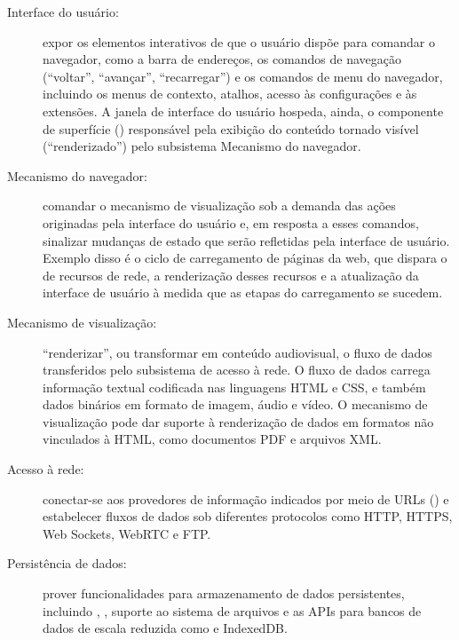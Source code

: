 \begin{quadro}[h]
	\begin{framed}{\small
	\begin{description}
		\item [Interface do usuário:] expor os elementos interativos de que o usuário dispõe para comandar o navegador, como a barra de endereços, os comandos de navegação (``voltar'', ``avançar'', ``recarregar'') e os comandos de menu do navegador, incluindo os menus de contexto, atalhos, acesso às configurações e às extensões. A janela de interface do usuário hospeda, ainda, o componente de superfície () responsável pela exibição do conteúdo tornado visível (``renderizado'') pelo subsistema Mecanismo do navegador.
		
		\item [Mecanismo do navegador:] comandar o mecanismo de visualização sob a demanda das ações originadas pela interface do usuário e, em resposta a esses comandos, sinalizar mudanças de estado que serão refletidas pela interface de usuário. Exemplo disso é o ciclo de carregamento de páginas da web, que dispara o  de recursos de rede, a renderização desses recursos e a atualização da interface de usuário à medida que as etapas do carregamento se sucedem.
		
		\item [Mecanismo de visualização:] ``renderizar'', ou transformar em conteúdo audiovisual, o fluxo de dados transferidos pelo subsistema de acesso à rede. O fluxo de dados carrega informação textual codificada nas linguagens HTML e CSS, e também dados binários em formato de imagem, áudio e vídeo. O mecanismo de visualização pode dar suporte à renderização de dados em formatos não vinculados à HTML, como documentos PDF e arquivos XML.
		
		\item [Acesso à rede:] conectar-se aos provedores de informação indicados por meio de URLs () e estabelecer fluxos de dados sob diferentes protocolos como HTTP, HTTPS, Web Sockets, WebRTC e FTP.
		
		\item [Persistência de dados:] prover funcionalidades para armazenamento de dados persistentes, incluindo , , suporte ao sistema de arquivos e as APIs para bancos de dados de escala reduzida como  e IndexedDB.
		

\end{description}}
\end{framed}
\end{quadro}

